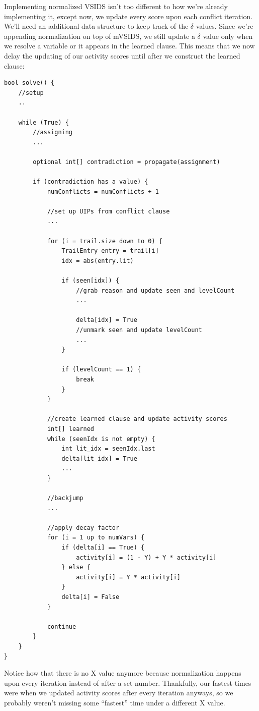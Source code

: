 \documentclass[../main.tex]{subfiles}
\begin{document}
Implementing normalized VSIDS isn't too different to how we're already implementing it,
except now, we update every score upon each conflict iteration. We'll need an additional 
data structure to keep track of the $\delta$ values. Since we're appending normalization 
on top of mVSIDS, we still update a $\delta$ value only when we resolve a variable or it 
appears in the learned clause. This means that we now delay the updating of our activity 
scores until after we construct the learned clause:
\begin{lstlisting}
bool solve() {
    //setup
    ..

    while (True) {
        //assigning
        ...

        optional int[] contradiction = propagate(assignment)

        if (contradiction has a value) {
            numConflicts = numConflicts + 1

            //set up UIPs from conflict clause
            ...

            for (i = trail.size down to 0) {
                TrailEntry entry = trail[i]
                idx = abs(entry.lit)

                if (seen[idx]) {
                    //grab reason and update seen and levelCount
                    ...

                    delta[idx] = True
                    //unmark seen and update levelCount
                    ...
                }

                if (levelCount == 1) {
                    break
                }
            }

            //create learned clause and update activity scores
            int[] learned
            while (seenIdx is not empty) {
                int lit_idx = seenIdx.last
                delta[lit_idx] = True
                ...
            }

            //backjump
            ...

            //apply decay factor
            for (i = 1 up to numVars) {
                if (delta[i] == True) {
                    activity[i] = (1 - Y) + Y * activity[i]
                } else {
                    activity[i] = Y * activity[i]
                }
                delta[i] = False
            }

            continue
        }
    }
}
\end{lstlisting}
\noindent
Notice how that there is no X value anymore because normalization happens upon 
every iteration instead of after a set number. Thankfully, our fastest times were 
when we updated activity scores after every iteration anyways, so we probably weren't 
missing some ``fastest'' time under a different X value.
\end{document}
